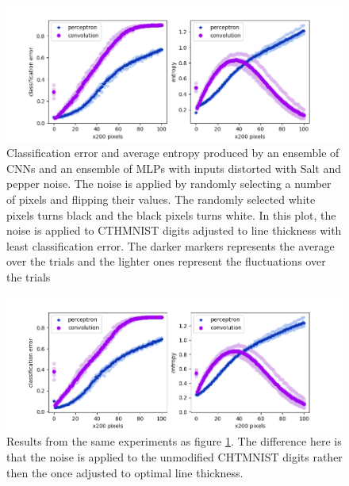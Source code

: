 \begin{figure}
    \centering
    \includegraphics[scale=0.7]{figure/trippySaltnPepperOPT.png}
    \caption{Classification error and average entropy produced by an ensemble of CNNs and an ensemble of MLPs with inputs distorted with Salt and pepper noise. The noise is applied by randomly selecting a number of pixels and flipping their values. The randomly selected white pixels turns black and the black pixels turns white. In this plot, the noise is applied to CTHMNIST digits adjusted to line thickness with least classification error. The darker markers represents the average over the trials and the lighter ones represent the fluctuations over the trials}
    \label{fig:saltpepper2}
\end{figure}

\begin{figure}
    \centering
    \includegraphics[scale=0.7]{figure/trippySaltnPepperLecunn.png}
    \caption{Results from the same experiments as figure \ref{fig:saltpepper2}. The difference here is that the noise is applied to the unmodified CHTMNIST digits rather then the once adjusted to optimal line thickness.}
    \label{fig:saltpepper2b}
\end{figure}

